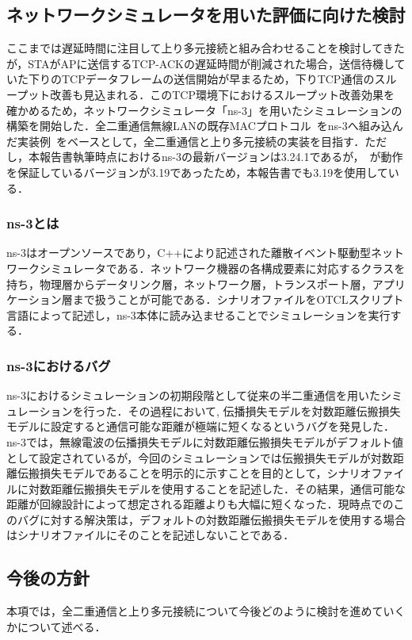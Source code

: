 \documentclass[technicalreport]{ieicej}
\begin{document}
	\subsection{ネットワークシミュレータを用いた評価に向けた検討}
	ここまでは遅延時間に注目して上り多元接続と組み合わせることを検討してきたが，STAがAPに送信するTCP-ACKの遅延時間が削減された場合，送信待機していた下りのTCPデータフレームの送信開始が早まるため，下りTCP通信のスループット改善も見込まれる．このTCP環境下におけるスループット改善効果を確かめるため，ネットワークシミュレータ「ns-3」を用いたシミュレーションの構築を開始した．全二重通信無線LANの既存MACプロトコル~\cite{tamaki}をns-3へ組み込んだ実装例~\cite{ns-3}をベースとして，全二重通信と上り多元接続の実装を目指す．ただし，本報告書執筆時点におけるns-3の最新バージョンは3.24.1であるが，~\cite{ns-3}が動作を保証しているバージョンが3.19であったため，本報告書でも3.19を使用している．
		\subsubsection{ns-3とは}
		ns-3はオープンソースであり，C++により記述された離散イベント駆動型ネットワークシミュレータである．ネットワーク機器の各構成要素に対応するクラスを持ち，物理層からデータリンク層，ネットワーク層，トランスポート層，アプリケーション層まで扱うことが可能である．シナリオファイルをOTCLスクリプト言語によって記述し，ns-3本体に読み込ませることでシミュレーションを実行する．
		\subsubsection{ns-3におけるバグ}
		ns-3におけるシミュレーションの初期段階として従来の半二重通信を用いたシミュレーションを行った．その過程において,
		伝播損失モデルを対数距離伝搬損失モデルに設定すると通信可能な距離が極端に短くなるというバグを発見した．
		ns-3では，無線電波の伝播損失モデルに対数距離伝搬損失モデルがデフォルト値として設定されているが，今回のシミュレーションでは伝搬損失モデルが対数距離伝搬損失モデルであることを明示的に示すことを目的として，シナリオファイルに対数距離伝搬損失モデルを使用することを記述した．その結果，通信可能な距離が回線設計によって想定される距離よりも大幅に短くなった．現時点でのこのバグに対する解決策は，デフォルトの対数距離伝搬損失モデルを使用する場合はシナリオファイルにそのことを記述しないことである．

	\subsection{今後の方針}
	本項では，全二重通信と上り多元接続について今後どのように検討を進めていくかについて述べる．
\end{document}
